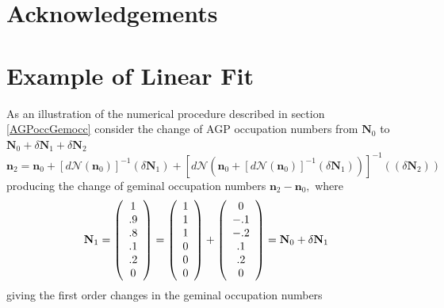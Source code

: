 \documentclass[aps,preprint]{revtex4}%
\begin{document}
\section{Acknowledgements}

\appendix

\section{Example of Linear Fit\label{LinfitEX}}

As an illustration of the numerical procedure described in section
\ref{AGPoccGemocc} consider the change of AGP occupation numbers from
$\mathbf{N}_{0}$ to $\mathbf{N}_{0}+\delta\mathbf{N}_{1}+\delta\mathbf{N}%
_{2}$
\begin{equation}
\mathbf{n}_{2}=\mathbf{n}_{0}+\left[  d\mathcal{N}\left(  \mathbf{n}%
_{0}\right)  \right]  ^{-1}\left(  \delta\mathbf{N}_{1}\right)  +\left[
d\mathcal{N}\left(  \mathbf{n}_{0}+\left[  d\mathcal{N}\left(  \mathbf{n}%
_{0}\right)  \right]  ^{-1}\left(  \delta\mathbf{N}_{1}\right)  \right)
\right]  ^{-1}\left(  \left(  \delta\mathbf{N}_{2}\right)  \right)
\end{equation}
producing the change of geminal occupation numbers $\mathbf{n}_{2}%
-\mathbf{n}_{0},$ where
\begin{equation}
\mathbf{N}_{1}=\left(
\begin{array}
[c]{c}%
1\\
.9\\
.8\\
.1\\
.2\\
0
\end{array}
\right)  =\left(
\begin{array}
[c]{c}%
1\\
1\\
1\\
0\\
0\\
0
\end{array}
\right)  +\left(
\begin{array}
[c]{c}%
0\\
-.1\\
-.2\\
.1\\
.2\\
0
\end{array}
\right)  =\mathbf{N}_{0}+\delta\mathbf{N}_{1}%
\end{equation}
giving the first order changes in the geminal occupation numbers
\end{document}
